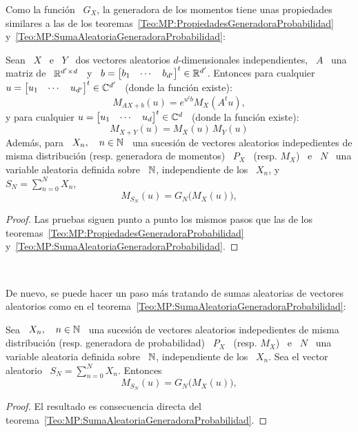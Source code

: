 Como la funci\'on \ $G_X$, la  generadora de los momentos tiene unas propiedades
similares  a las  de  los teoremas~\ref{Teo:MP:PropiedadesGeneradoraProbabilidad}
y~\ref{Teo:MP:SumaAleatoriaGeneradoraProbabilidad}:
%
\begin{teorema}%
\label{Teo:MP:PropiedadesGeneradoraMomentos}
%
  Sean  \   $X$  \  e  \   $Y$  \  dos   vectores  aleatorios  $d$-dimensionales
  independientes,  \ $A$  \ una  matriz de  \  $\mathbb{R}^{d' \times  d}$ \  y \  $b
  =   \begin{bmatrix}    b_1   &    \cdots   &   b_{d'}    \end{bmatrix}^t   \in
  \mathbb{R}^{d'}$.  Entonces para  cualquier $u  =  \begin{bmatrix} u_1  & \cdots  &
    u_{d'} \end{bmatrix}^t \in \mathbb{C}^{d'}$ \ (donde la funci\'on existe):
  \[
  M_{A X + b}(u) =  e^{u^t b} M_X\left( A^t u \right),
  \]
  y para cualquier  $u = \begin{bmatrix} u_1 & \cdots  & u_d \end{bmatrix}^t \in
  \mathbb{C}^d$ \ (donde la funci\'on existe):
  \[
  M_{X+Y}(u) = M_X(u) \, M_Y(u)
  \]
  Adem\'as,  para \  $X_n, \quad  n  \in \mathbb{N}$  \, una  sucesi\'on de  vectores
  aleatorios  indepedientes  de   misma  distribuci\'on  (resp.   generadora  de
  momentos) \ $P_X$ \ (resp. $M_X$) \  e \ $N$ \ una variable aleatoria definida
  sobre \ $\mathbb{N}$, independiente de los \ $X_n$, y \ $ S_N = \sum_{n=0}^N X_n$,
  \[
  M_{S_N}(u) =  G_N \big( M_X(u) \big),
  \]
\end{teorema}
%
\begin{proof}
  Las  pruebas  siguen   punto  a  punto  los  mismos  pasos   que  las  de  los
  teoremas~\ref{Teo:MP:PropiedadesGeneradoraProbabilidad}
  y~\ref{Teo:MP:SumaAleatoriaGeneradoraProbabilidad}.
\end{proof}

\

De nuevo, se puede hacer un  paso m\'as tratando de sumas aleatorias de vectores
aleatorios como en el teorema~\ref{Teo:MP:SumaAleatoriaGeneradoraProbabilidad}:
%
\begin{teorema}
\label{Teo:MP:SumaAleatoriaGeneradoraMomentos}
%
  Sea  \ $X_n,  \quad n  \in  \mathbb{N}$ \,  una sucesi\'on  de vectores  aleatorios
  indepedientes de  misma distribuci\'on  (resp.  generadora de  probabilidad) \
  $P_X$ \  (resp. $M_X$) \  e \  $N$ \ una  variable aleatoria definida  sobre \
  $\mathbb{N}$,  independiente de los  \ $X_n$.  Sea el  vector aleatorio  \ $  S_N =
  \sum_{n=0}^N X_n$. Entonces
  \[
  M_{S_N}(u) =  G_N \big( M_X(u) \big),
  \]
\end{teorema}
%
\begin{proof}
  El         resultado        es         consecuencia         directa        del
  teorema~\ref{Teo:MP:SumaAleatoriaGeneradoraProbabilidad}.
\end{proof}


